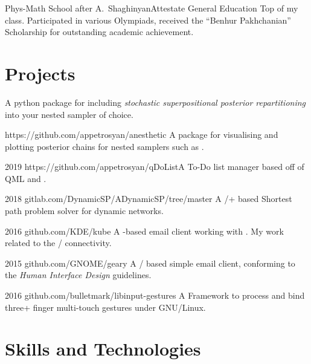 \documentclass{CurriculumVitae}[10pt, draft, condensed]
\begin{document}
{ {Phys-Math School after
  A.~Shaghinyan}{Attestate }{General Education} {Top of my
  class. Participated in various Olympiads, received the ``Benhur
  Pakhchanian'' Scholarship for outstanding academic achievement. }

\section*{Projects}

{A python package for including \emph{stochastic superpositional posterior repartitioning} into your nested sampler of choice.}

{https://github.com/appetrosyan/anesthetic}
{A package for visualising and plotting posterior chains for nested samplers such as .}

 {2019}
{https://github.com/appetrosyan/qDoList}{A To-Do
  list manager based off of QML and .}

 {2018}
{gitlab.com/DynamicSP/ADynamicSP/tree/master} {A
  /+ based Shortest path problem solver
  for dynamic networks. }

 {2016} {github.com/KDE/kube} {A -based
  email client working with . My work related to
  the / connectivity. }

 {2015} {github.com/GNOME/geary} {A
  / based simple email client, conforming to
  the  \emph{Human Interface Design} guidelines.}

 {2016}
{github.com/bulletmark/libinput-gestures} {A Framework to process and
  bind three+ finger multi-touch gestures under GNU/Linux. }



\section*{Skills and Technologies}

\begin{multicols}{4}
  

\end{multicols}}
\end{document}
